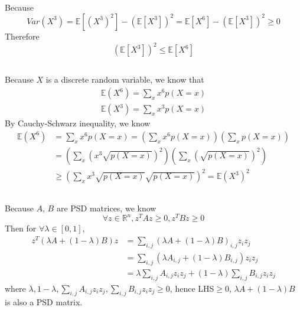 \documentclass{article}
\begin{document}
    \subsection{}\label{3.1}
        Because
        \begin{equation*}
            Var(X^3)=\mathbb{E}[(X^3)^2]-\left(\mathbb{E}[X^3]\right)^2=\mathbb{E}[X^6]-\left(\mathbb{E}[X^3]\right)^2\geq0
        \end{equation*}
        Therefore
        \begin{equation*}
            \left(\mathbb{E}[X^3]\right)^2\leq\mathbb{E}[X^6]
        \end{equation*}

    \subsection{}\label{3.2}
        Because $X$ is a discrete random variable, we know that
        \begin{align*}
            \mathbb{E}(X^6)=\sum_x x^6p(X=x)\\
            \mathbb{E}(X^3)=\sum_x x^3p(X=x)
        \end{align*}
        By Cauchy-Schwarz inequality, we know
        \begin{align*}
            \mathbb{E}(X^6)&=\sum_x x^6p(X=x)=\left(\sum_x x^6p(X=x)\right)\left(\sum_x p(X=x)\right)\\
            &=\left(\sum_x \left(x^3\sqrt{p(X=x)}\right)^2\right)\left(\sum_x \left(\sqrt{p(X=x)}\right)^2\right)\\
            &\geq\left(\sum_xx^3\sqrt{p(X=x)}\sqrt{p(X=x)}\right)^2=\mathbb{E}(X^3)^2
        \end{align*}

    \subsection{}\label{3.3}
        Because $A$, $B$ are PSD matrices, we know
        \begin{equation*}
            \forall z \in \mathbb{R}^n, z^TAz\geq 0, z^TBz\geq 0
        \end{equation*}
        Then for $\forall \lambda \in [0, 1]$, 
        \begin{align*}
            z^T(\lambda A+(1-\lambda)B)z&=\sum_{i,j} (\lambda A+(1-\lambda)B)_{i,j}z_i z_j\\
            &=\sum_{i,j}\left(\lambda A_{i,j} + (1-\lambda)B_{i,j}\right)z_i z_j\\
            &=\lambda\sum_{i,j} A_{i,j}z_i z_j + (1-\lambda) \sum_{i,j} B_{i,j}z_i z_j
        \end{align*}
        where $\lambda, 1-\lambda, \sum_{i,j} A_{i,j}z_i z_j, \sum_{i,j} B_{i,j}z_i z_j \geq 0$, hence LHS$\geq0$,
        $\lambda A+(1-\lambda)B$ is also a PSD matrix.
\end{document}
